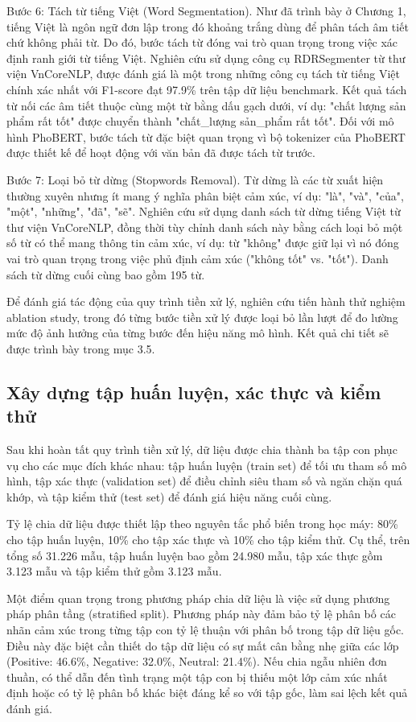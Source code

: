 \documentclass[14pt, a4paper]{report}
\begin{document}
Bước 6: Tách từ tiếng Việt (Word Segmentation). Như đã trình bày ở Chương 1, tiếng Việt là ngôn ngữ đơn lập trong đó khoảng trắng dùng để phân tách âm tiết chứ không phải từ. Do đó, bước tách từ đóng vai trò quan trọng trong việc xác định ranh giới từ tiếng Việt. Nghiên cứu sử dụng công cụ RDRSegmenter từ thư viện VnCoreNLP, được đánh giá là một trong những công cụ tách từ tiếng Việt chính xác nhất với F1-score đạt 97.9\% trên tập dữ liệu benchmark. Kết quả tách từ nối các âm tiết thuộc cùng một từ bằng dấu gạch dưới, ví dụ: "chất lượng sản phẩm rất tốt" được chuyển thành "chất\_lượng sản\_phẩm rất tốt". Đối với mô hình PhoBERT, bước tách từ đặc biệt quan trọng vì bộ tokenizer của PhoBERT được thiết kế để hoạt động với văn bản đã được tách từ trước.


Bước 7: Loại bỏ từ dừng (Stopwords Removal). Từ dừng là các từ xuất hiện thường xuyên nhưng ít mang ý nghĩa phân biệt cảm xúc, ví dụ: "là", "và", "của", "một", "những", "đã", "sẽ". Nghiên cứu sử dụng danh sách từ dừng tiếng Việt từ thư viện VnCoreNLP, đồng thời tùy chỉnh danh sách này bằng cách loại bỏ một số từ có thể mang thông tin cảm xúc, ví dụ: từ "không" được giữ lại vì nó đóng vai trò quan trọng trong việc phủ định cảm xúc ("không tốt" vs. "tốt"). Danh sách từ dừng cuối cùng bao gồm 195 từ.


Để đánh giá tác động của quy trình tiền xử lý, nghiên cứu tiến hành thử nghiệm ablation study, trong đó từng bước tiền xử lý được loại bỏ lần lượt để đo lường mức độ ảnh hưởng của từng bước đến hiệu năng mô hình. Kết quả chi tiết sẽ được trình bày trong mục 3.5.


\subsection{Xây dựng tập huấn luyện, xác thực và kiểm thử}


Sau khi hoàn tất quy trình tiền xử lý, dữ liệu được chia thành ba tập con phục vụ cho các mục đích khác nhau: tập huấn luyện (train set) để tối ưu tham số mô hình, tập xác thực (validation set) để điều chỉnh siêu tham số và ngăn chặn quá khớp, và tập kiểm thử (test set) để đánh giá hiệu năng cuối cùng.


Tỷ lệ chia dữ liệu được thiết lập theo nguyên tắc phổ biến trong học máy: 80\% cho tập huấn luyện, 10\% cho tập xác thực và 10\% cho tập kiểm thử. Cụ thể, trên tổng số 31.226 mẫu, tập huấn luyện bao gồm 24.980 mẫu, tập xác thực gồm 3.123 mẫu và tập kiểm thử gồm 3.123 mẫu.


Một điểm quan trọng trong phương pháp chia dữ liệu là việc sử dụng phương pháp phân tầng (stratified split). Phương pháp này đảm bảo tỷ lệ phân bố các nhãn cảm xúc trong từng tập con tỷ lệ thuận với phân bố trong tập dữ liệu gốc. Điều này đặc biệt cần thiết do tập dữ liệu có sự mất cân bằng nhẹ giữa các lớp (Positive: 46.6\%, Negative: 32.0\%, Neutral: 21.4\%). Nếu chia ngẫu nhiên đơn thuần, có thể dẫn đến tình trạng một tập con bị thiếu một lớp cảm xúc nhất định hoặc có tỷ lệ phân bố khác biệt đáng kể so với tập gốc, làm sai lệch kết quả đánh giá.
\end{document}
